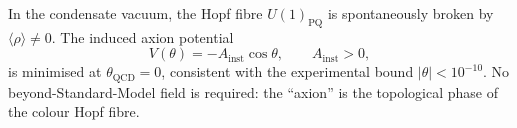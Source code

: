 

\begin{proposition}[Strong CP: $\theta_{\mathrm{QCD}}=0$]
\label{P5:prop:strongCP}
\label{P5:prop:theta_Z3}
In the condensate vacuum, the Hopf fibre $U(1)_{\mathrm{PQ}}$
is spontaneously broken by $\langle\rho\rangle\neq0$.
The induced axion potential
\begin{equation}
  V(\theta) = -A_{\mathrm{inst}}\cos\theta, \qquad A_{\mathrm{inst}}>0,
  \label{P5:eq:V_theta}
\end{equation}
is minimised at $\theta_{\mathrm{QCD}}=0$, consistent with the experimental
bound $|\theta|<10^{-10}$.
No beyond-Standard-Model field is required: the ``axion'' is the
topological phase of the colour Hopf fibre.
\end{proposition}

